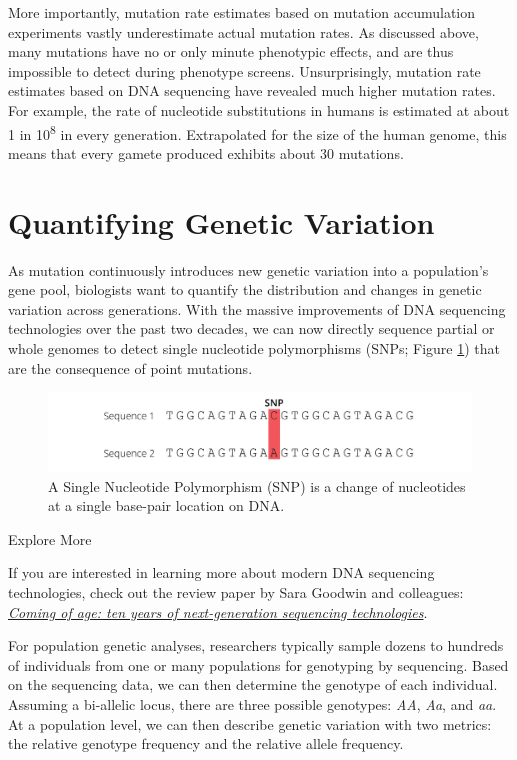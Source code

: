 \documentclass[
]{book}
\begin{document}
More importantly, mutation rate estimates based on mutation accumulation experiments vastly underestimate actual mutation rates. As discussed above, many mutations have no or only minute phenotypic effects, and are thus impossible to detect during phenotype screens. Unsurprisingly, mutation rate estimates based on DNA sequencing have revealed much higher mutation rates. For example, the rate of nucleotide substitutions in humans is estimated at about 1 in 10\textsuperscript{8} in every generation. Extrapolated for the size of the human genome, this means that every gamete produced exhibits about 30 mutations.

\hypertarget{quantifying-genetic-variation}{%
\section{Quantifying Genetic Variation}\label{quantifying-genetic-variation}}

As mutation continuously introduces new genetic variation into a population's gene pool, biologists want to quantify the distribution and changes in genetic variation across generations. With the massive improvements of DNA sequencing technologies over the past two decades, we can now directly sequence partial or whole genomes to detect single nucleotide polymorphisms (SNPs; Figure \ref{fig:snps}) that are the consequence of point mutations.

\begin{figure}
\includegraphics[width=1\linewidth]{images/SNP} \caption{A Single Nucleotide Polymorphism (SNP) is a change of nucleotides at a single base-pair location on DNA.}\label{fig:snps}
\end{figure}

Explore More

If you are interested in learning more about modern DNA sequencing technologies, check out the review paper by Sara Goodwin and colleagues: \href{https://www-nature-com.er.lib.k-state.edu/articles/nrg.2016.49}{\emph{Coming of age: ten years of next-generation sequencing technologies}}.

For population genetic analyses, researchers typically sample dozens to hundreds of individuals from one or many populations for genotyping by sequencing. Based on the sequencing data, we can then determine the genotype of each individual. Assuming a bi-allelic locus, there are three possible genotypes: \emph{AA}, \emph{Aa}, and \emph{aa}. At a population level, we can then describe genetic variation with two metrics: the relative genotype frequency and the relative allele frequency.
\end{document}
